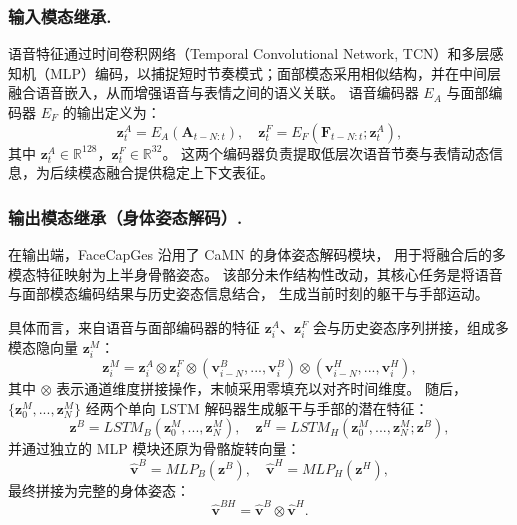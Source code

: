 \subsubsection{输入模态继承.}

语音特征通过时间卷积网络（Temporal Convolutional Network, TCN）和多层感知机（MLP）编码，以捕捉短时节奏模式；面部模态采用相似结构，并在中间层融合语音嵌入，从而增强语音与表情之间的语义关联。  
语音编码器 $E_A$ 与面部编码器 $E_F$ 的输出定义为：
\begin{equation}
\mathbf{z}^A_t = E_A(\mathbf{A}_{t-N:t}), \quad
\mathbf{z}^F_t = E_F(\mathbf{F}_{t-N:t}; \mathbf{z}^A_t),
\end{equation}
其中 $\mathbf{z}^A_t \in \mathbb{R}^{128}$，$\mathbf{z}^F_t \in \mathbb{R}^{32}$。  
这两个编码器负责提取低层次语音节奏与表情动态信息，为后续模态融合提供稳定上下文表征。

\subsubsection{输出模态继承（身体姿态解码）.}

在输出端，FaceCapGes 沿用了 CaMN 的身体姿态解码模块，
用于将融合后的多模态特征映射为上半身骨骼姿态。
该部分未作结构性改动，其核心任务是将语音与面部模态编码结果与历史姿态信息结合，
生成当前时刻的躯干与手部运动。

具体而言，来自语音与面部编码器的特征
$\bm{z}_i^A$、$\bm{z}_i^F$ 会与历史姿态序列拼接，组成多模态隐向量 $\bm{z}_i^M$：
\begin{equation}
\bm{z}_i^M = \bm{z}_i^A \otimes \bm{z}_i^F \otimes (\bm{v}_{i-N}^{B}, ..., \bm{v}_i^{B}) \otimes (\bm{v}_{i-N}^{H}, ..., \bm{v}_i^{H}),
\end{equation}
其中 $\otimes$ 表示通道维度拼接操作，末帧采用零填充以对齐时间维度。
随后，$\{\bm{z}_0^M, ..., \bm{z}_N^M\}$ 经两个单向 LSTM 解码器生成躯干与手部的潜在特征：
\begin{equation}
\bm{z}^B = LSTM_B(\bm{z}_0^M, ..., \bm{z}_N^M), \quad
\bm{z}^H = LSTM_H(\bm{z}_0^M, ..., \bm{z}_N^M; \bm{z}^B),
\end{equation}
并通过独立的 MLP 模块还原为骨骼旋转向量：
\begin{equation}
\hat{\bm{v}}^B = MLP_B(\bm{z}^B), \quad \hat{\bm{v}}^H = MLP_H(\bm{z}^H),
\end{equation}
最终拼接为完整的身体姿态：
\begin{equation}
\hat{\bm{v}}^{BH} = \hat{\bm{v}}^B \otimes \hat{\bm{v}}^H.
\end{equation}

